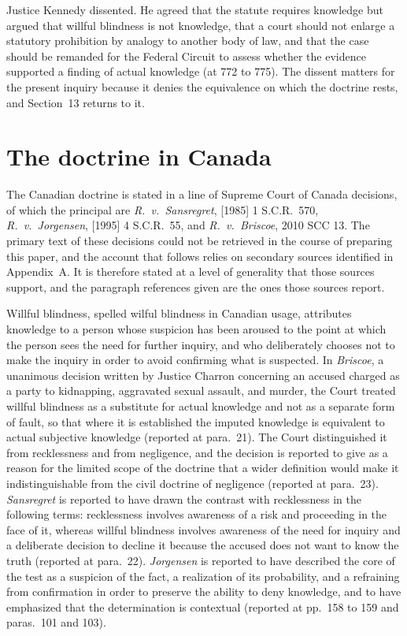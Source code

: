 \documentclass[11pt]{article}
\theoremstyle{plain}
\theoremstyle{definition}
\begin{document}
Justice Kennedy dissented. He agreed that the statute requires knowledge but argued that willful blindness is not knowledge, that a court should not enlarge a statutory prohibition by analogy to another body of law, and that the case should be remanded for the Federal Circuit to assess whether the evidence supported a finding of actual knowledge (at 772 to 775). The dissent matters for the present inquiry because it denies the equivalence on which the doctrine rests, and Section~13 returns to it.

\section{The doctrine in Canada}

The Canadian doctrine is stated in a line of Supreme Court of Canada decisions, of which the principal are \emph{R.\ v.\ Sansregret}, [1985] 1 S.C.R.\ 570, \emph{R.\ v.\ Jorgensen}, [1995] 4 S.C.R.\ 55, and \emph{R.\ v.\ Briscoe}, 2010 SCC 13. The primary text of these decisions could not be retrieved in the course of preparing this paper, and the account that follows relies on secondary sources identified in Appendix~A. It is therefore stated at a level of generality that those sources support, and the paragraph references given are the ones those sources report.

Willful blindness, spelled wilful blindness in Canadian usage, attributes knowledge to a person whose suspicion has been aroused to the point at which the person sees the need for further inquiry, and who deliberately chooses not to make the inquiry in order to avoid confirming what is suspected. In \emph{Briscoe}, a unanimous decision written by Justice Charron concerning an accused charged as a party to kidnapping, aggravated sexual assault, and murder, the Court treated willful blindness as a substitute for actual knowledge and not as a separate form of fault, so that where it is established the imputed knowledge is equivalent to actual subjective knowledge (reported at para.\ 21). The Court distinguished it from recklessness and from negligence, and the decision is reported to give as a reason for the limited scope of the doctrine that a wider definition would make it indistinguishable from the civil doctrine of negligence (reported at para.\ 23). \emph{Sansregret} is reported to have drawn the contrast with recklessness in the following terms: recklessness involves awareness of a risk and proceeding in the face of it, whereas willful blindness involves awareness of the need for inquiry and a deliberate decision to decline it because the accused does not want to know the truth (reported at para.\ 22). \emph{Jorgensen} is reported to have described the core of the test as a suspicion of the fact, a realization of its probability, and a refraining from confirmation in order to preserve the ability to deny knowledge, and to have emphasized that the determination is contextual (reported at pp.\ 158 to 159 and paras.\ 101 and 103).
\end{document}
